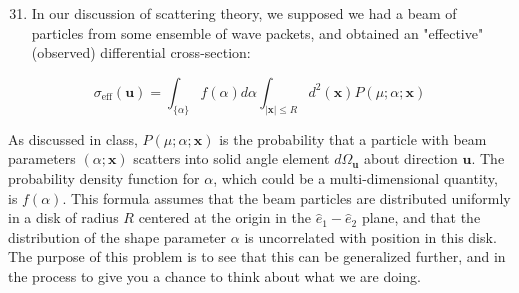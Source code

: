 \documentclass[12pt]{article}
\begin{document}
\section{}
\begin{enumerate}
  \setcounter{enumi}{30}
  \item In our discussion of scattering theory, we supposed we had a beam of particles from some ensemble of wave packets, and obtained an "effective" (observed) differential cross-section:
\end{enumerate}


\begin{equation*}
\sigma_{\mathrm{eff}}(\mathbf{u})=\int_{\{\alpha\}} f(\alpha) d \alpha \int_{|\mathbf{x}| \leq R} d^{2}(\mathbf{x}) P(\mu ; \alpha ; \mathbf{x}) \tag{3}
\end{equation*}


As discussed in class, $P(\mu ; \alpha ; \mathbf{x})$ is the probability that a particle with beam parameters $(\alpha ; \mathbf{x})$ scatters into solid angle element $d \Omega_{\mathbf{u}}$ about direction $\mathbf{u}$. The probability density function for $\alpha$, which could be a multi-dimensional quantity, is $f(\alpha)$. This formula assumes that the beam particles are distributed uniformly in a disk of radius $R$ centered at the origin in the $\hat{e}_{1}-\hat{e}_{2}$ plane, and that the distribution of the shape parameter $\alpha$ is uncorrelated with position in this disk. The purpose of this problem is to see that this can be generalized further, and in the process to give you a chance to think about what we are doing.
\end{document}
